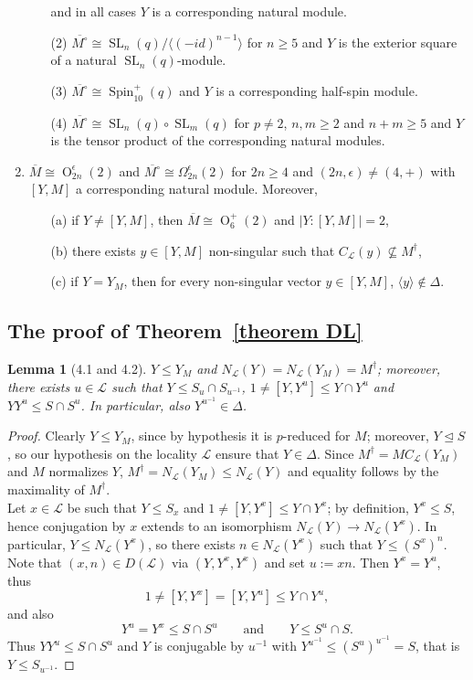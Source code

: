 \documentclass{amsart}
\numberwithin{equation}{section}
\newtheorem{lemma}[equation]{Lemma}
\theoremstyle{definition}
\theoremstyle{subresult}
\theoremstyle{caseresult}
\newcounter{maintheorem}
\renewcommand{\themaintheorem}{}
\newenvironment{maintheorem}[1]
{%
	\def\customname{#1}%
	\renewcommand{\themaintheorem}{\customname}%
	\refstepcounter{maintheorem}%
	\trivlist
	\item[\hskip\labelsep\bfseries Theorem~\themaintheorem.]%
	\itshape
}
{%
	\endtrivlist
}
\renewcommand{\L}{\mathcal{L}}
\newcommand{\SL}{\operatorname{SL}}
\newcommand{\Spin}{\operatorname{Spin}}
\renewcommand{\O}{\operatorname{O}}
\newcommand{\ov}{\overline}
\newcommand{\norm}{\trianglelefteq}
\newcommand{\inv}{^{-1}}
\newcommand{\fto}{\longrightarrow}
\newcommand{\<}{\langle}
\renewcommand{\>}{\rangle}
\begin{document}
\begin{maintheorem}{D$\L$}
\begin{enumerate}
\begin{itemize}
			and in all cases $Y$ is a corresponding natural module.
			\item[(2)] $\ov{M^\circ} \cong \SL_n(q) / \< (-id)^{n-1} \>$ for $n \ge 5$ and $Y$ is the exterior square of a natural $\SL_n(q)$-module.
			\item[(3)] $\ov{M^\circ} \cong \Spin_{10}^+(q)$ and $Y$ is a corresponding half-spin module.
			\item[(4)] $\ov{M^\circ} \cong \SL_n(q) \circ \SL_m(q)$ for $p \ne 2$, $n,m \ge 2$ and $n+m \ge 5$ and $Y$ is the tensor product of the corresponding natural modules.
		\end{itemize}
		\item $\ov{M} \cong \O_{2n}^\epsilon (2)$ and $\ov{M^\circ} \cong \Omega_{2n}^\epsilon(2)$ for $2n \ge 4$ and $(2n,\epsilon) \ne (4,+)$ with $[Y,M]$ a corresponding natural module. Moreover,
		\begin{itemize}
			\item[(a)] if $Y \ne [Y,M]$, then $\ov{M} \cong \O_6^+(2)$ and $|Y:[Y,M]| =2$,
			\item[(b)] there exists $y \in [Y,M]$ non-singular such that $C_\L(y) \not \subseteq M^\dagger$,
			\item[(c)] if $Y=Y_M$, then for every non-singular vector $y \in [Y,M]$, $\< y \> \not \in \Delta$.
		\end{itemize}
	\end{enumerate}
\end{maintheorem}


\subsection{The proof of Theorem~\ref{theorem DL}}

\begin{lemma}[4.1 and 4.2]\label{lemma4.2}
	$Y \le Y_M$ and $N_\L(Y) = N_\L(Y_M)=M^\dagger$; moreover, there exists $u \in \L$ such that $Y \le S_u \cap S_{u\inv}$, $1 \ne [Y,Y^u] \le Y \cap Y^u$ and $YY^u \le S \cap S^u$. In particular, also $Y^{u\inv} \in \Delta$.
\end{lemma}
\begin{proof}
	Clearly $Y \le Y_M$, since by hypothesis it is $p$-reduced for $M$; moreover, $Y \norm S$, so our hypothesis on the locality $\L$ ensure that $Y \in \Delta$. Since $M^\dagger = MC_\L(Y_M)$ and $M$ normalizes $Y$, $M^\dagger = N_\L(Y_M) \le N_\L(Y)$ and equality follows by the maximality of $M^\dagger$.\\
	
	Let $x \in \L$ be such that $Y \le S_x$ and $1 \ne [Y,Y^x] \le Y \cap Y^x$; by definition, $Y^x \le S$, hence conjugation by $x$ extends to an isomorphism $N_\L(Y) \fto N_\L(Y^x)$. In particular, $Y \le N_\L(Y^x)$, so there exists $n \in N_\L(Y^x)$ such that $Y \le (S^x)^n$. Note that $(x,n) \in D(\L)$ via $(Y,Y^x,Y^x)$ and set $u:=xn$. Then $Y^x = Y^u$, thus
	\[
	1 \ne [Y,Y^x] = [Y,Y^u] \le Y \cap Y^u,
	\]
	and also
	\[
	Y^u = Y^x \le S \cap S^u \qquad \text{and} \qquad Y \le S^u \cap S.
	\]
	Thus $YY^u \le S \cap S^u$ and $Y$ is conjugable by $u\inv$ with $Y^{u\inv} \le (S^u)^{u\inv} = S$, that is $Y \le S_{u\inv}$.
\end{proof}
\end{document}
